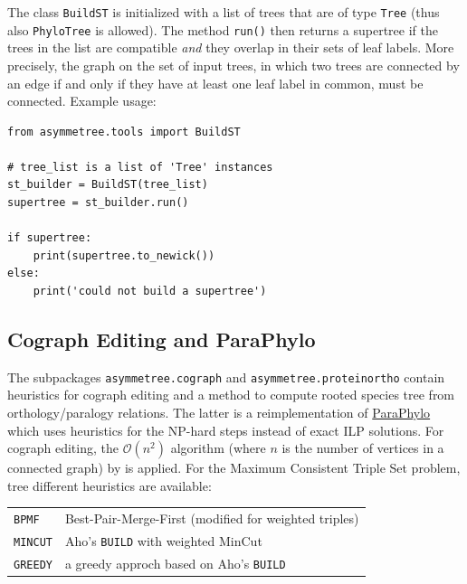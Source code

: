 \documentclass[hidelinks,11pt]{article}
\begin{document}
The class \texttt{BuildST} is initialized with a list of trees that are of type \texttt{Tree} (thus also \texttt{PhyloTree} is allowed).
The method \texttt{run()} then returns a supertree if the trees in the list are compatible \emph{and} they overlap in their sets of leaf labels.
More precisely, the graph on the set of input trees, in which two trees are connected by an edge if and only if they have at least one leaf label in common, must be connected.
Example usage:

\begin{adjustwidth}{1cm}{1cm}\vspace{2mm}
\begin{verbatim}
from asymmetree.tools import BuildST

# tree_list is a list of 'Tree' instances
st_builder = BuildST(tree_list)
supertree = st_builder.run()

if supertree:
    print(supertree.to_newick())
else:
    print('could not build a supertree')
\end{verbatim}
\end{adjustwidth}



\subsection{Cograph Editing and ParaPhylo}

The subpackages \texttt{asymmetree.cograph} and \texttt{asymmetree.proteinortho} contain heuristics for cograph editing and a method to compute rooted species tree from orthology/paralogy relations.
The latter is a reimplementation of \href{http://pacosy.informatik.uni-leipzig.de/208-0-ParaPhylo.html}{ParaPhylo} \citep{hellmuth2015} which uses heuristics for the NP-hard steps instead of exact ILP solutions.
For cograph editing, the $\mathcal{O}(n^2)$ algorithm (where $n$ is the number of vertices in a connected graph) by \citet{crespelle2019} is applied.
For the Maximum Consistent Triple Set problem, tree different heuristics are available:

\vspace{3mm}
{\small\centering
\begin{longtable}{ p{2.5cm} p{9cm} }
	\texttt{BPMF} & Best-Pair-Merge-First \citep{wu2004} (modified for weighted triples)\\
	\texttt{MINCUT} & Aho's \texttt{BUILD} with weighted MinCut \citep{aho1981,byrka2010}\\
	\texttt{GREEDY} & a greedy approch based on Aho's \texttt{BUILD}\\
\end{longtable}
}
\vspace{3mm}
\end{document}
